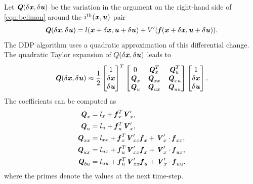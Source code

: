 Let $\bQ(\dx,\du)$ be the variation in the argument on the right-hand side of \cref{eqn:bellman} around the $i^{th} (\bx,\bu)$ pair
\begin{equation}\label{eqn:Q}
\bQ(\dx,\du)=l(\bx+\dx,\bu+\du)+V'(\bfun(\bx+\dx,\bu+\du)).
\end{equation}
The \gls{DDP} algorithm uses a quadratic approximation of this differential change. The quadratic Taylor expansion of $Q(\dx,\du)$ leads to
\begin{equation}\label{eqn:QApprox}
\bQ(\dx,\du) \approx \dfrac{1}{2} 
\begin{bmatrix} 1 \\ \dx \\ \du \end{bmatrix}^T 
\begin{bmatrix} 0 & \bQ_{x}^T & \bQ_{u}^T \\
\bQ_{x} & \bQ_{xx} & \bQ_{xu} \\
\bQ_{u} & \bQ_{ux} & \bQ_{uu} \end{bmatrix}
\begin{bmatrix} 1 \\ \dx \\ \du \end{bmatrix}.
\end{equation}
The coefficients can be computed as  
\begin{subequations}\label{eqn:QApproxCoeff}
\begin{align}
\bQ_{x} &= l_{x}+\bfun_{x}^T \bV_{x}^\prime, \\
\bQ_{u} &= l_{u}+\bfun_{u}^T \bV_{x}^\prime, \\
\bQ_{xx} &= l_{xx}+\bfun_{x}^T \bV_{xx}^\prime\bfun_{x}+\bV_{x}^\prime\cdot\bfun_{xx}  \label{subeqn:Qxx},\\
\bQ_{ux} &= l_{ux}+\bfun_{u}^T \bV_{xx}^\prime\bfun_{x}+\bV_{x}^\prime\cdot\bfun_{ux} \label{subeqn:Qux},\\
\bQ_{bu} &= l_{uu}+\bfun_{u}^T \bV_{xx}^\prime\bfun_{u}+\bV_{x}^\prime\cdot\bfun_{uu} \label{subeqn:Quu}.
\end{align}
\end{subequations}
where the primes denote the values at the next time-step.  

